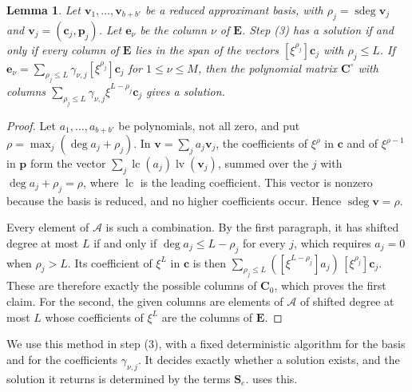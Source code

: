 \documentclass[b5paper, 10pt, abstract=true, captions=tableheading]{scrartcl}
\theoremstyle{plain}
\newtheorem{lemma}{Lemma}
\theoremstyle{definition}
\renewcommand{\vec}[1]{\symbf{#1}}
\newcommand{\mat}[1]{\symbf{#1}}
\begin{document}
\begin{lemma}\label{lem:wiedemann-predictable}
Let $\vec v_1,\ldots,\vec v_{b+b'}$ be a reduced approximant basis, with
$\rho_j=\operatorname{sdeg}\vec v_j$ and $\vec v_j=(\vec c_j,\vec p_j)$.
Let $\vec e_\nu$ be the column $\nu$ of $\mat E$.
Step (3) has a solution if and only if every column of $\mat E$ lies in
the span of the vectors $[\xi^{\rho_j}]\vec c_j$ with $\rho_j\leq L$.
If $\vec e_\nu=\sum_{\rho_j\leq L}\gamma_{\nu,j}[\xi^{\rho_j}]\vec c_j$ for
$1\leq\nu\leq M$, then the polynomial matrix $\mat C^\circ$ with columns
$\sum_{\rho_j\leq L}\gamma_{\nu,j}\xi^{L-\rho_j}\vec c_j$ gives a
solution.
\end{lemma}
\begin{proof}
Let $a_1,\ldots,a_{b+b'}$ be polynomials, not all zero, and put
$\rho=\max_j(\deg a_j+\rho_j)$. In $\vec v=\sum_ja_j\vec v_j$, the
coefficients of $\xi^\rho$ in $\vec c$ and of $\xi^{\rho-1}$ in
$\vec p$ form the vector $\sum_j\operatorname{lc}(a_j)\operatorname{lv}(\vec
v_j)$, summed over the $j$ with $\deg a_j+\rho_j=\rho$, where
$\operatorname{lc}$ is the leading coefficient. This vector is nonzero
because the basis is reduced, and no higher coefficients occur. Hence
$\operatorname{sdeg}\vec v=\rho$.

Every element of $\mathcal A$ is such a combination. By the first
paragraph, it has shifted degree at most $L$ if and only if
$\deg a_j\leq L-\rho_j$ for every $j$, which requires $a_j=0$ when
$\rho_j>L$. Its coefficient of $\xi^L$ in $\vec c$ is then
$\sum_{\rho_j\leq L}([\xi^{L-\rho_j}]a_j)\,[\xi^{\rho_j}]\vec c_j$.
These are therefore exactly the possible columns of $\mat C_0$, which
proves the first claim. For the second, the given columns are elements of
$\mathcal A$ of shifted degree at most $L$ whose coefficients of $\xi^L$
are the columns of $\mat E$.
\end{proof}

We use this method in step (3), with a fixed deterministic algorithm for
the basis and for the coefficients $\gamma_{\nu,j}$. It decides exactly
whether a solution exists, and the solution it returns is determined by
the terms $\mat S_e$.  uses this.
\end{document}
